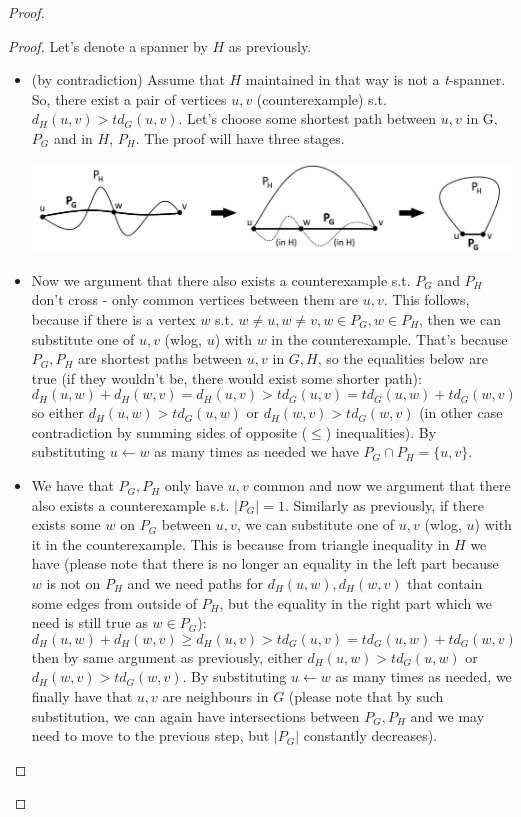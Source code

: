 \documentclass[11pt]{article}
\begin{document}
\begin{proof}
\begin{enumerate}
\begin{proof}
	 Let's denote a spanner by $H$ as previously. \\
	\begin{itemize}
		\item (by contradiction) Assume that $H$ maintained in that way is not a \textit{t}-spanner. So, there exist a pair of vertices $u,v$ (counterexample) s.t. $d_H(u,v) > t d_G(u,v)$. Let's choose some shortest path between $u,v$ in G, $P_G$ and in $H$, $P_H$. The proof will have three stages. 
		\begin{center}
			\includegraphics[width=\linewidth]{lecture_12_proof_stages.png}
		\end{center}
		\item Now we argument that there also exists a counterexample s.t. $P_G$ and $P_H$ don't cross - only common vertices between them are $u, v$. This follows, because if there is a vertex $w$ s.t. $w \neq u, w \neq v, w \in P_G, w \in P_H$, then we can substitute one of $u, v$ (wlog, $u$) with $w$ in the counterexample. That's because $P_G, P_H$ are shortest paths between $u,v$ in $G,H$, so the equalities below are true (if they wouldn't be, there would exist some shorter path):
		$$ d_H(u,w) + d_H(w,v) = d_H(u,v) > td_G(u,v) = td_G(u,w) + td_G(w,v)$$
		so either $d_H(u,w) > td_G(u,w)$ or $d_H(w,v) > td_G(w,v)$ (in other case contradiction by summing sides of opposite ($\leq$) inequalities). By substituting $u \leftarrow w$ as many times as needed we have $P_G \cap P_H = \{u,v\} $.
		\item We have that $P_G, P_H$ only have $u,v$ common and now we argument that there also exists a counterexample s.t. $|P_G|=1$. Similarly as previously, if there exists some $w$ on $P_G$ between $u,v$, we can substitute one of $u,v$ (wlog, $u$) with it in the counterexample. This is because from triangle inequality in $H$ we have (please note that there is no longer an equality in the left part because $w$ is not on $P_H$ and we need paths for $d_H(u,w), d_H(w, v)$ that contain some edges from outside of $P_H$, but the equality in the right part which we need is still true as $w \in P_G$):
		$$ d_H(u,w) + d_H(w, v) \geq d_H(u,v) > td_G(u,v) = td_G(u,w) + td_G(w,v)$$
		then by same argument as previously, either $d_H(u,w) > td_G(u,w)$ or $d_H(w,v) > td_G(w,v)$. By substituting $u \leftarrow w$ as many times as needed, we finally have that $u,v$ are neighbours in $G$ (please note that by such substitution, we can again have intersections between $P_G, P_H$ and we may need to move to the previous step, but $|P_G|$ constantly decreases).

\end{itemize}
\end{proof}
\end{enumerate}
\end{proof}
\end{document}
